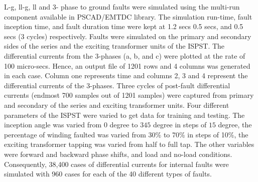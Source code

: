 \documentclass[conference]{IEEEtran}
\begin{document}
L-g, ll-g, ll and 3- phase to ground faults were simulated using the multi-run component available in PSCAD/EMTDC library. The simulation run-time, fault inception time, and fault duration time were kept at 1.2 secs 0.5 secs, and 0.5 secs (3 cycles) respectively. Faults were simulated on the primary and secondary sides of the series and the exciting transformer units of the ISPST. The differential currents from the 3-phases (a, b, and c) were plotted at the rate of 100 micro-secs. Hence, an output file of 1201 rows and 4 columns was generated in each case. Column one represents time and columns 2, 3 and 4 represent the differential currents of the 3-phases. Three cycles of post-fault differential currents (endmost 700 samples out of 1201 samples) were captured from primary and secondary of the series and exciting transformer units. Four different parameters of the ISPST were varied to get data for training and testing. The inception angle was varied from $0$ degree to $345$ degree in steps of $15$ degree, the percentage of winding faulted was varied from 30\% to 70\% in steps of 10\%, the exciting transformer tapping was varied from half to full tap. The other variables were forward and backward phase shifts, and load and no-load conditions. Consequently, 38,400 cases of differential currents for internal faults were simulated with 960 cases for each of the 40 different types of faults.
\end{document}
